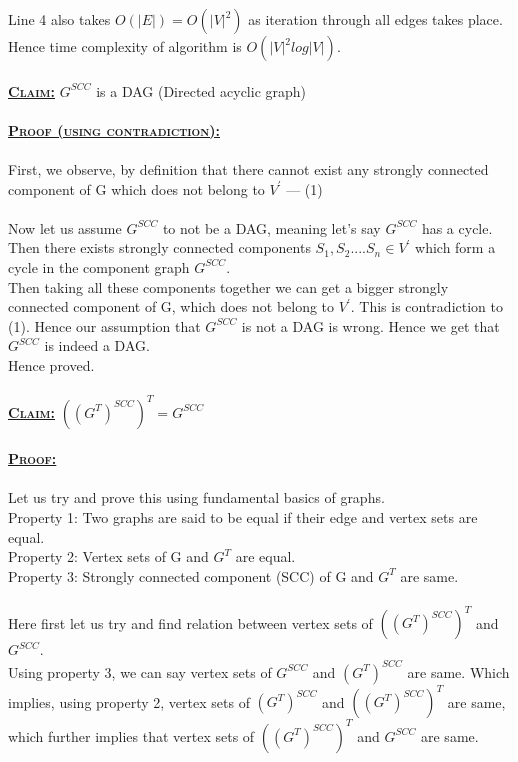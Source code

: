 \documentclass[a4 paper]{article}
\begin{document}
Line 4 also takes $O(|E|) = O(|V|^{2})$ as iteration through all edges takes place.\\
Hence time complexity of algorithm is $O(|V|^{2}log|V|)$.\\
\newpage
{}
\\
\textbf{\underline{\textsc{Claim:}}} $G^{SCC}$ is a DAG (Directed acyclic graph)\\\\
\textbf{\underline{\textsc{Proof (using contradiction):}}}\\\\
First, we observe, by definition that there cannot exist any strongly connected component of G which does not belong to $V^{'}$ --- (1)\\\\
Now let us assume $G^{SCC}$ to not be a DAG, meaning let's say $G^{SCC}$ has a cycle.\\
Then there exists strongly connected components $S_{1},S_{2}....S_{n} \in V^{'}$ which form a cycle in the component graph $G^{SCC}$.\\
Then taking all these components together we can get a bigger strongly connected component of G, which does not belong to $V^{'}$. This is contradiction to (1). Hence our assumption that $G^{SCC}$ is not a DAG is wrong. Hence we get that $G^{SCC}$ is indeed a DAG.\\ Hence proved.\\\\
\textbf{\underline{\textsc{Claim:}}} $((G^{T})^{SCC})^{T} = G^{SCC}$\\\\
\textbf{\underline{\textsc{Proof:}}}\\\\
Let us try and prove this using fundamental basics of graphs.\\
Property 1: Two graphs are said to be equal if their edge and vertex sets are equal.\\
Property 2: Vertex sets of G and $G^{T}$ are equal.\\
Property 3: Strongly connected component (SCC) of G and $G^{T}$ are same.\\\\
Here first let us try and find relation between vertex sets of  $((G^{T})^{SCC})^{T}$ and $G^{SCC}$.\\
Using property 3, we can say vertex sets of $G^{SCC}$ and $(G^{T})^{SCC}$ are same. Which implies, using property 2, vertex sets of $(G^{T})^{SCC}$ and $((G^{T})^{SCC})^{T}$ are same, which further implies that vertex sets of $((G^{T})^{SCC})^{T}$ and $G^{SCC}$ are same.\\\\
\end{document}
